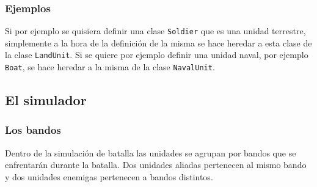 \subsubsection{Ejemplos}

Si por ejemplo se quisiera definir una clase \verb|Soldier| que es una unidad terrestre, simplemente a la hora de la definici\'on de la misma se hace heredar a esta clase de la clase \verb|LandUnit|. Si se quiere por ejemplo definir una unidad naval, por ejemplo \verb|Boat|, se hace heredar a la misma de la clase \verb|NavalUnit|.  

\subsection{El simulador}

\subsubsection{Los bandos}

Dentro de la simulaci\'on de batalla las  unidades se agrupan por bandos que se enfrentar\'an durante la batalla. Dos unidades aliadas pertenecen al mismo bando y dos unidades enemigas pertenecen a bandos distintos.

